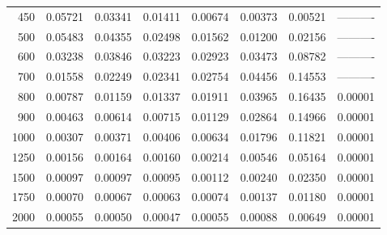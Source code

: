 \begin{table}[ht]
\begin{tabular}{r|c|c|c|c|c|c|c}
      450 & 0.05721 & 0.03341 & 0.01411 & 0.00674 & 0.00373 & 0.00521 & ---------- \\
      500 & 0.05483 & 0.04355 & 0.02498 & 0.01562 & 0.01200 & 0.02156 & ---------- \\
      600 & 0.03238 & 0.03846 & 0.03223 & 0.02923 & 0.03473 & 0.08782 & ---------- \\
      700 & 0.01558 & 0.02249 & 0.02341 & 0.02754 & 0.04456 & 0.14553 & ---------- \\
      800 & 0.00787 & 0.01159 & 0.01337 & 0.01911 & 0.03965 & 0.16435 & 0.00001 \\
      900 & 0.00463 & 0.00614 & 0.00715 & 0.01129 & 0.02864 & 0.14966 & 0.00001 \\
     1000 & 0.00307 & 0.00371 & 0.00406 & 0.00634 & 0.01796 & 0.11821 & 0.00001 \\
     1250 & 0.00156 & 0.00164 & 0.00160 & 0.00214 & 0.00546 & 0.05164 & 0.00001 \\
     1500 & 0.00097 & 0.00097 & 0.00095 & 0.00112 & 0.00240 & 0.02350 & 0.00001 \\
     1750 & 0.00070 & 0.00067 & 0.00063 & 0.00074 & 0.00137 & 0.01180 & 0.00001 \\
     2000 & 0.00055 & 0.00050 & 0.00047 & 0.00055 & 0.00088 & 0.00649 & 0.00001 \\ \cline{1-8}
    \end{tabular}
    \label{tab:XRayEffOE2}
\end{table}

